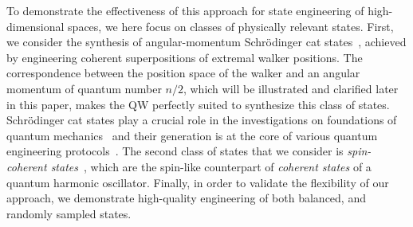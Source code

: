 To demonstrate the effectiveness of this approach for state engineering of high-dimensional spaces, we here focus on classes of physically relevant states. First, we consider the synthesis of angular-momentum Schr\"odinger cat states~\cite{militello2006distilling}, achieved by engineering coherent superpositions of extremal walker positions. The correspondence between the position space of the walker and an angular momentum of quantum number $n/2$, which will be illustrated and clarified later in this paper, makes the \ac{QW} perfectly suited to synthesize this class of states. Schr\"odinger cat states play a crucial role in the investigations on foundations of quantum mechanics~\cite{schrodinger1935gegenwartige} and their generation is at the core of various quantum engineering protocols~\cite{brune1992manipulation, monroe1996schrodinger,agarwal1997atomic, zhang2016creating}. The second class of states that we consider is \emph{spin-coherent states}~\cite{ulyanov1999spin}, which are the spin-like counterpart of \emph{coherent states} of a quantum harmonic oscillator. Finally, in order to validate the flexibility of our approach, we demonstrate high-quality engineering of both balanced, and randomly sampled states.

